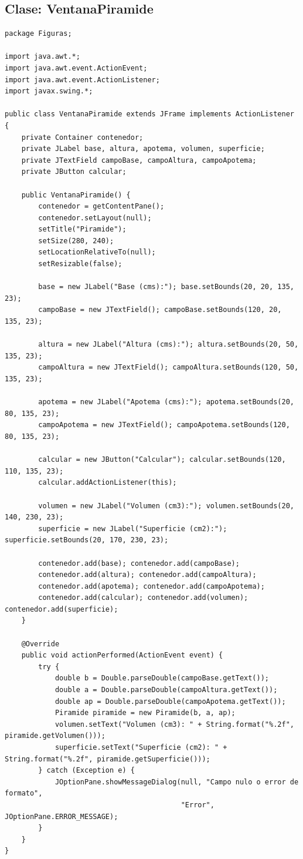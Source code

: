 \documentclass[12pt,a4paper]{article}
\begin{document}
\subsection*{Clase: VentanaPiramide}
\begin{lstlisting}[caption={Clase VentanaPiramide.java}]
package Figuras;

import java.awt.*;
import java.awt.event.ActionEvent;
import java.awt.event.ActionListener;
import javax.swing.*;

public class VentanaPiramide extends JFrame implements ActionListener {
    private Container contenedor;
    private JLabel base, altura, apotema, volumen, superficie;
    private JTextField campoBase, campoAltura, campoApotema;
    private JButton calcular;

    public VentanaPiramide() {
        contenedor = getContentPane();
        contenedor.setLayout(null);
        setTitle("Piramide");
        setSize(280, 240);
        setLocationRelativeTo(null);
        setResizable(false);

        base = new JLabel("Base (cms):"); base.setBounds(20, 20, 135, 23);
        campoBase = new JTextField(); campoBase.setBounds(120, 20, 135, 23);

        altura = new JLabel("Altura (cms):"); altura.setBounds(20, 50, 135, 23);
        campoAltura = new JTextField(); campoAltura.setBounds(120, 50, 135, 23);

        apotema = new JLabel("Apotema (cms):"); apotema.setBounds(20, 80, 135, 23);
        campoApotema = new JTextField(); campoApotema.setBounds(120, 80, 135, 23);

        calcular = new JButton("Calcular"); calcular.setBounds(120, 110, 135, 23);
        calcular.addActionListener(this);

        volumen = new JLabel("Volumen (cm3):"); volumen.setBounds(20, 140, 230, 23);
        superficie = new JLabel("Superficie (cm2):"); superficie.setBounds(20, 170, 230, 23);

        contenedor.add(base); contenedor.add(campoBase);
        contenedor.add(altura); contenedor.add(campoAltura);
        contenedor.add(apotema); contenedor.add(campoApotema);
        contenedor.add(calcular); contenedor.add(volumen); contenedor.add(superficie);
    }

    @Override
    public void actionPerformed(ActionEvent event) {
        try {
            double b = Double.parseDouble(campoBase.getText());
            double a = Double.parseDouble(campoAltura.getText());
            double ap = Double.parseDouble(campoApotema.getText());
            Piramide piramide = new Piramide(b, a, ap);
            volumen.setText("Volumen (cm3): " + String.format("%.2f", piramide.getVolumen()));
            superficie.setText("Superficie (cm2): " + String.format("%.2f", piramide.getSuperficie()));
        } catch (Exception e) {
            JOptionPane.showMessageDialog(null, "Campo nulo o error de formato",
                                          "Error", JOptionPane.ERROR_MESSAGE);
        }
    }
}
\end{lstlisting}
\end{document}
